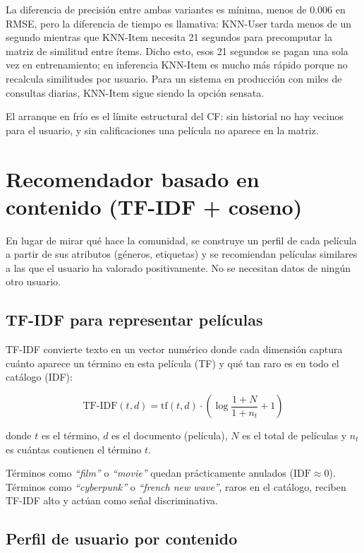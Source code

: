 La diferencia de precisión entre ambas variantes es mínima, menos de 0.006 en RMSE, pero la diferencia de tiempo es llamativa: KNN-User tarda menos de un segundo mientras que KNN-Item necesita 21 segundos para precomputar la matriz de similitud entre ítems. Dicho esto, esos 21 segundos se pagan una sola vez en entrenamiento; en inferencia KNN-Item es mucho más rápido porque no recalcula similitudes por usuario. Para un sistema en producción con miles de consultas diarias, KNN-Item sigue siendo la opción sensata.

El arranque en frío es el límite estructural del CF: sin historial no hay vecinos para el usuario, y sin calificaciones una película no aparece en la matriz.

\section{Recomendador basado en contenido (TF-IDF + coseno)}

En lugar de mirar qué hace la comunidad, se construye un perfil de cada película a partir de sus atributos (géneros, etiquetas) y se recomiendan películas similares a las que el usuario ha valorado positivamente. No se necesitan datos de ningún otro usuario.

\subsection{TF-IDF para representar películas}

TF-IDF convierte texto en un vector numérico donde cada dimensión captura cuánto aparece un término en esta película (TF) y qué tan raro es en todo el catálogo (IDF):

\begin{equation}
    \mathrm{TF\text{-}IDF}(t, d) = \mathrm{tf}(t,d) \cdot \left(\log\frac{1+N}{1+n_t} + 1\right)
\end{equation}

donde $t$ es el término, $d$ es el documento (película), $N$ es el total de películas y $n_t$ es cuántas contienen el término $t$.

Términos como \emph{``film''} o \emph{``movie''} quedan prácticamente anulados ($\mathrm{IDF} \approx 0$). Términos como \emph{``cyberpunk''} o \emph{``french new wave''}, raros en el catálogo, reciben TF-IDF alto y actúan como señal discriminativa.

\subsection{Perfil de usuario por contenido}

